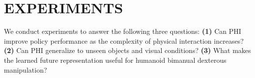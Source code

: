 \documentclass{article} %
\begin{document}


\section{EXPERIMENTS}
\label{sec:experiments}

We conduct experiments to answer the following three questions:
\textbf{(1)} Can PHI improve policy performance as the complexity of physical interaction increases?
\textbf{(2)} Can PHI generalize to unseen objects and visual conditions?
\textbf{(3)} What makes the learned future representation useful for humanoid bimanual dexterous manipulation?
\end{document}
